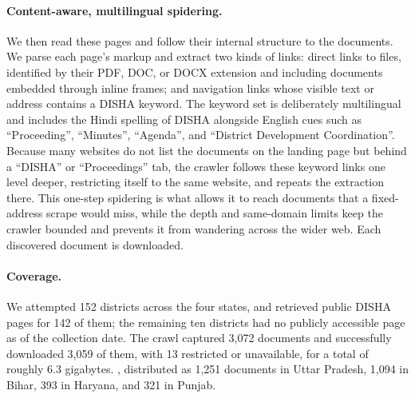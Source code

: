 \documentclass[12pt]{article}
\begin{document}
{\paragraph{Content-aware, multilingual spidering.} We then read these pages and follow their internal structure to the documents. We parse each
page's markup and extract two kinds of links: direct links to files, identified
by their PDF, DOC, or DOCX extension and including documents embedded through
inline frames; and navigation links whose visible text or address contains a
DISHA keyword. The keyword set is deliberately multilingual and includes the
Hindi spelling of DISHA alongside English cues such as ``Proceeding'',
``Minutes'', ``Agenda'', and ``District Development Coordination''. Because many
websites do not list the documents on the landing page but behind a ``DISHA'' or
``Proceedings'' tab, the crawler follows these keyword links one level deeper,
restricting itself to the same website, and repeats the extraction there. This
one-step spidering is what allows it to reach documents that a fixed-address
scrape would miss, while the depth and same-domain limits keep the crawler bounded
and prevents it from wandering across the wider web. Each discovered document is downloaded.


\paragraph{Coverage.} We attempted 152 districts across the four states, and
retrieved public DISHA pages for 142 of them; the remaining ten districts had no
publicly accessible page as of the collection date. The crawl captured 3,072
documents and successfully downloaded 3,059 of them, with 13 restricted or
unavailable, for a total of roughly 6.3 gigabytes. , distributed as 1,251
documents in Uttar Pradesh, 1,094 in Bihar, 393 in Haryana, and 321 in Punjab.

}
\end{document}
